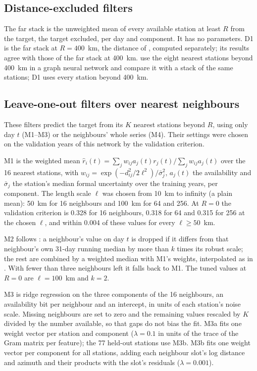 \documentclass[preprint,12pt,authoryear]{elsarticle}
\begin{document}
\subsection{Distance-excluded filters}
\label{sec:filters-distance}

The far stack is the unweighted mean of every available station at least $R$ from the target, the target excluded, per day and component. It has no parameters. D1 is the far stack at $R = 400$~km, the distance of \citet{bachelot2025}, computed separately; its results agree with those of the far stack at 400~km. \citet{bachelot2025} use the eight nearest stations beyond 400~km in a graph neural network and compare it with a stack of the same stations; D1 uses every station beyond 400~km.

\subsection{Leave-one-out filters over nearest neighbours}
\label{sec:filters-loo}

These filters predict the target from its $K$ nearest stations beyond $R$, using only day $t$ (M1--M3) or the neighbours' whole series (M4). Their settings were chosen on the validation years of this network by the validation criterion.

M1 is the weighted mean $\hat r_i(t) = \sum_j w_{ij} a_j(t) r_j(t) / \sum_j w_{ij} a_j(t)$ over the 16 nearest stations, with $w_{ij} = \exp(-d_{ij}^2/2\ell^2)/\bar\sigma_j^2$, $a_j(t)$ the availability and $\bar\sigma_j$ the station's median formal uncertainty over the training years, per component. The length scale $\ell$ was chosen from 10~km to infinity (a plain mean): 50~km for 16 neighbours and 100~km for 64 and 256. At $R = 0$ the validation criterion is 0.328 for 16 neighbours, 0.318 for 64 and 0.315 for 256 at the chosen $\ell$, and within 0.004 of these values for every $\ell \ge 50$~km.

M2 follows \citet{kreemer2021}: a neighbour's value on day $t$ is dropped if it differs from that neighbour's own 31-day running median by more than $k$ times its robust scale; the rest are combined by a weighted median with M1's weights, interpolated as in \citet{kreemer2021}. With fewer than three neighbours left it falls back to M1. The tuned values at $R = 0$ are $\ell = 100$~km and $k = 2$.

M3 is ridge regression on the three components of the 16 neighbours, an availability bit per neighbour and an intercept, in units of each station's noise scale. Missing neighbours are set to zero and the remaining values rescaled by $K$ divided by the number available, so that gaps do not bias the fit. M3a fits one weight vector per station and component ($\lambda = 0.1$ in units of the trace of the Gram matrix per feature); the 77 held-out stations use M3b. M3b fits one weight vector per component for all stations, adding each neighbour slot's log distance and azimuth and their products with the slot's residuals ($\lambda = 0.001$).
\end{document}
